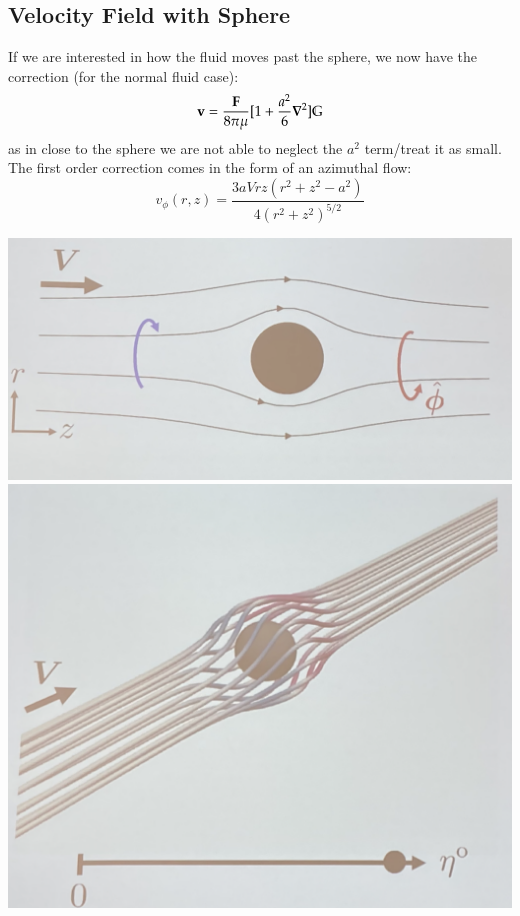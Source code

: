 \subsection{Velocity Field with Sphere}
If we are interested in how the fluid moves past the sphere, we now have the correction (for the normal fluid case):
\begin{equation}
    \v{v} = \frac{\v{F}}{8\pi \mu}[1 + \frac{a^2}{6}\nabla^2]\mathbb{G}
\end{equation}
as in close to the sphere we are not able to neglect the $a^2$ term/treat it as small. The first order correction comes in the form of an azimuthal flow:
\begin{equation}
    v_\phi(r, z) = \frac{3aVrz(r^2 + z^2 - a^2)}{4(r^2 + z^2)^{5/2}}
\end{equation}

\begin{center}
    \includegraphics[scale=0.35]{Lectures/Images/lec12-oddsphere.png}
    \includegraphics[scale=0.35]{Lectures/Images/lec12-oddsphere3d.png}
\end{center}

